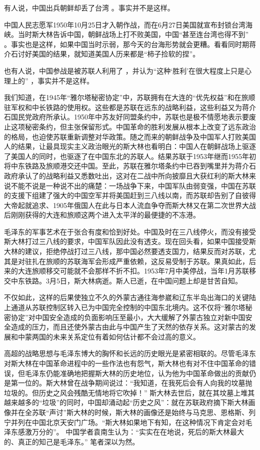 \documentclass[UTF8, 12pt, a4paper]{ctexrep}
\begin{document}
有人说，中国出兵朝鲜却丢了台湾 。事实并不是这样。

中国人民志愿军1950年10月25日才入朝作战，而在6月27日美国就宣布封锁台湾海峡。当时斯大林告诉中国，朝鲜战场上打不败美国，中国“甚至连台湾也得不到” 。事实也是这样，如果中国当时示弱，那今天的台海形势就会更糟。看看同时期蒋介石讨好美国的结果，就知道美国人历来都是“柿子捡软的捏”。

也有人说，中国参战是被苏联人利用了 ，并认为“这种‘胜利’在很大程度上只是心理上的” ，事实并不是这样。

我们知道，在1945年“雅尔塔秘密协定”中，苏联拥有在大连的“优先权益”和在旅顺驻军权和中长铁路的使用权。这些都是苏联在远东的战略利益，这些利益又为蒋介石国民党政府所承认。1950年中苏友好同盟条约中，苏联也是极不情愿地表示要废止这项秘密条约，但主张保留形式。中国革命的胜利发展从根本上改变了远东政治的格局，也迫使苏联重新调整对华政策。随之而来的朝鲜战争及中国军人打败美国人的结果，让最具现实主义政治眼光的斯大林也看明白：中国人在朝鲜战场上驱逐了美国人的同时，也驱逐了在中国东北的苏联人。结果苏联于1953年继而1955年初将中东铁路及旅顺港交还中国。至此，苏联在雅尔塔条约中已吞到嘴里并为蒋介石政府承认了的战略利益又悉数吐出，这对在二战中所向披靡且大获红利的斯大林来说不能不说是一种说不出的痛楚：一场战争下来，中国军队由弱变强，中国在苏联的支援下组建了强大的中国空军并将美国赶到三八线以南，而苏联却告别了自彼得大帝起就追求、1905年俄国人在此与日本人流血争夺而斯大林又在第二次世界大战后刚刚获得的大连和旅顺这两个进入太平洋的最便捷的不冻港。

毛泽东的军事艺术在于张合有度和恰到好处。中国及时在三八线停火，而没有接受斯大林打过三八线的要求，中国军队因此没有透支。现在回头看，如果中国接受斯大林的建议，拒绝停战打过三八线，那中国必然要透支国力，结果反而对苏联，尤其是对驻扎在旅顺的苏联海军会形成严重依赖，这反易受制于苏联。果真如此，后来的大连旅顺移交可能就不会那样不折不扣。1953年7月中美停战，当年1月苏联移交中东铁路。3月5日，斯大林病逝。斯人已逝，在中国问题上却是甘苦自知。

不仅如此，这样的后果使独立不久的外蒙古通往海参崴和辽东半岛出海口的关键陆上通道从苏联控制区转入已为中国完全控制的中国东北境内。这不仅将“雅尔塔秘密协定”对中国安全造成的负面影响压至最小，大大缓解了外蒙古独立对新中国安全造成的压力，而且还使外蒙古由此与中国产生了天然的依存关系。这对蒙古的发展和中蒙两国的未来关系定位有着如何估计都不会过高的意义。

高超的战略思想与毛泽东博大的胸怀和长远的历史眼光是紧密相联的。尽管毛泽东对斯大林在中国革命进程中的一些作法也有怨气，斯大林也有对不住中国革命的错误，但毛泽东仍能准确地把握斯大林的历史地位，认为他为中国革命做出的贡献仍是第一位的。斯大林曾在战争期间说过：“我知道，在我死后会有人向我的坟墓抛垃圾的。但历史之风会残酷无情地将它吹掉！” 斯大林去世后，就在其坟墓上堆其越来越多的“垃圾”的同时，中国却涌动起“历史之风”：就在苏联政府摘下斯大林画像并在全苏联“声讨”斯大林的时候，斯大林的画像还是始终与马克思、恩格斯、列宁并列在中国北京天安门广场。“斯大林如果地下有知，在这种情况下肯定会对毛泽东感激万分的”。 中国学者袁南生认为：“实实在在地说，死后的斯大林最大的、真正的知己是毛泽东。” 笔者深以为然。
\end{document}
